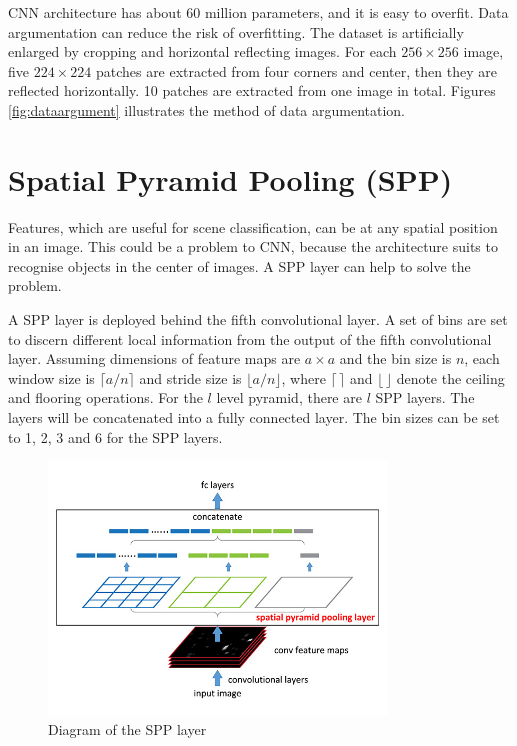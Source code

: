 CNN architecture \citep{krizhevsky2012imagenet} has about 60 million parameters, and it is easy to overfit. Data argumentation can reduce the risk of overfitting. The dataset is artificially enlarged by cropping and horizontal reflecting images. For each $256\times256$ image, five $224\times224$ patches are extracted from four corners and center, then they are reflected horizontally. 10 patches are extracted from one image in total. Figures \ref{fig:dataargument} illustrates the method of data argumentation.

\section{Spatial Pyramid Pooling (SPP)}

Features, which are useful for scene classification, can be at any spatial position in an image. This could be a problem to CNN, because the architecture suits to recognise objects in the center of images. A SPP layer can help to solve the problem.

A SPP layer is deployed behind the fifth convolutional layer. A set of bins are set to discern different local information from the output of the fifth convolutional layer. Assuming dimensions of feature maps are $a\times a$ and the bin size is $n$, each window size is $\lceil a/n \rceil$ and stride size is $\lfloor a/n \rfloor$, where $\lceil\,\rceil$ and $\lfloor\,\rfloor$ denote the ceiling and flooring operations. For the $l$ level pyramid, there are $l$ SPP layers. The layers will be concatenated into a fully connected layer. The bin sizes can be set to 1, 2, 3 and 6 for the SPP layers.

\begin{figure}[htb]
    \centering
	\includegraphics[width=0.8\textwidth]{sppnet.jpg}
    \caption{Diagram of the SPP layer \citep{he2014spatial}}%
    \label{fig:sppnet}%
\end{figure}

